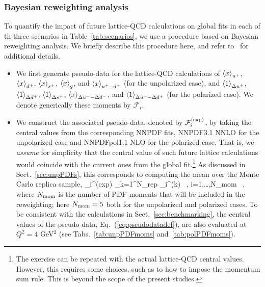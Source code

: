\subsubsection{Bayesian reweighting analysis}
\label{sec:projections:rw}

To quantify the impact of future lattice-QCD calculations on global fits 
in each of th three scenarios in Table~\ref{tab:scenarios},
we use a procedure based on Bayesian reweighting analysis.
%
We briefly describe this procedure here, and refer 
to~\cite{Ball:2011gg,Ball:2010gb} for additional details.

\begin{itemize}

\item We first generate pseudo-data for the lattice-QCD calculations
of $\left\langle x\right\rangle_{u^+}$, $\left\langle x\right\rangle_{d^+}$, $\left\langle x\right\rangle_{s^+}$,
$\left\langle x\right\rangle_{g}$, and $\left\langle x\right\rangle_{u^+-d^+}$ (for the unpolarized case), and
$\left\langle 1\right\rangle_{\Delta u^+}$, $\left\langle 1\right\rangle_{\Delta d^+}$,
$\left\langle 1\right\rangle_{\Delta s^+}$, $\left\langle x\right\rangle_{\Delta u^--\Delta d^-}$, and
$\left\langle 1\right\rangle_{\Delta u^+ - \Delta d^+}$ (for the polarized case).
%
We denote generically these moments by $\mathcal{F}_i$.
  
\item We construct the associated pseudo-data, denoted by 
$\mathcal{F}_i^{\rm (exp)}$, by taking the central values from
the corresponding NNPDF fits, NNPDF3.1 NNLO for the unpolarized case and 
NNPDFpol1.1 NLO for the polarized case.
%
That is, we {\it assume} for simplicity that the central value
of such future lattice calculations would coincide with the current ones
from the global fit.\footnote{ The exercise can be repeated
 with the actual lattice-QCD central values. However, this 
 requires some choices, such as to how to impose 
 the momentum sum rule.
 This is beyond the scope of the present studies.}
%
As discussed in Sect.~\ref{sec:unpPDFs}, this corresponds to computing
the mean over the Monte Carlo replica sample,
\be
\label{eq:pseudodatadef}
_i^{\rm (exp)} \equiv {}\sum_{k=1}^{N_{\rm rep}}
_i^{\rm (k)} \, , \quad i=1,\ldots,N_{\rm mom} \, ,
\ee
where $N_{\rm mom}$ is the number of PDF moments that will be included
in the reweighting; here $N_{\rm mom}=5$ both for the unpolarized and 
polarized cases.
%
To be consistent with the calculations in Sect.~\ref{sec:benchmarking},
the central values of the pseudo-data, Eq.~(\ref{eq:pseudodatadef}),
are also evaluated at $Q^2=4$ GeV$^2$ 
(see Tabs.~\ref{tab:unpPDFmoms} and~\ref{tab:polPDFmoms}).


\end{itemize}
